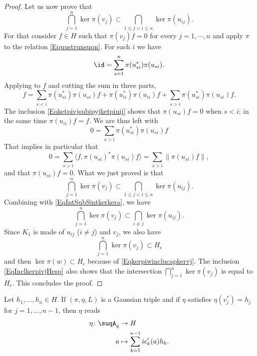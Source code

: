 \begin{proof}
    Let us now prove that
    \begin{equation}
        \bigcap_{j=1}^n\ker\pi(v_j)\subset\bigcap_{1\leq j<i\leq n}\ker\pi(u_{ij}).
    \end{equation}
    For that consider $f\in H$ such that $\pi(v_j)f=0$ for every $j=1,\cdots,n$ and apply $\pi$ to the relation \eqref{Equustrunsuqn}. For each $i$ we have
    \begin{equation}
        \id=\sum_{s=1}^n\pi(u_{si}^*)\pi(u_{si}).
    \end{equation}
    Applying to $f$ and cutting the sum in three parts,
    \begin{equation}
        f=\sum_{s<i}\pi(u_{si}^*)\pi(u_{si})f+\pi(u_{ii}^*)\pi(u_{ii})f+\sum_{s>i}\pi(u_{si}^*)\pi(u_{si})f.
    \end{equation}
    The inclusion \eqref{Eqketpivjsubipyjketpiuij} shows that $\pi(u_{si})f=0$ when $s<i$; in the same time $\pi(u_{ii})f=f$. We are thus left with
    \begin{equation}
        0=\sum_{s>i}\pi(u_{si}^*)\pi(u_{si})f
    \end{equation}
    That implies in particular that
    \begin{equation}
        0=\sum_{s>i}\langle f, \pi(u_{si})^*\pi(u_{si})f\rangle =\sum_{s>i}\| \pi(u_{si})f \|,
    \end{equation}
    and that $\pi(u_{si})f=0$. What we just proved is that
    \begin{equation}
        \bigcap_{j=1}^n\ker\pi(v_j)\subset\bigcap_{1\leq j<i\leq n}\ker\pi(u_{ij}).
    \end{equation}
    Combining with \eqref{EqIntSubSintkerkera}, we have
    \begin{equation}
        \bigcap_{j=1}^n\ker\pi(v_j)\subset\bigcap_{i\neq j}\ker\pi(u_{ij}).
    \end{equation}
    Since $K_1$ is made of $u_{ij}$ ($i\neq j$) and $v_j$, we also have
    \begin{equation}        \label{EqInclkerpivjHesp}
        \bigcap_{j=1}^n\ker\pi(v_j)\subset H_{\epsilon}
    \end{equation}
    and then $\ker \pi(w)\subset H_{\epsilon}$ because of \eqref{Eqkerpiwinclucapkervj}. The inclusion \eqref{EqInclkerpivjHesp} also shows that the intersection $\bigcap_{j=1}^n\ker\pi(v_j)$ is equal to $H_{\epsilon}$. This concludes the proof.
\end{proof}

\begin{proposition}
    Let $h_1,\ldots,h_n\in H$. If $(\pi,\eta,L)$ is a Gaussian triple and if $\eta$ satisfies $\eta(v_j^*)=h_j$ for $j=1,\ldots,n-1$, then $\eta$ reads
    \begin{equation}        \label{EqDefEtaCocyGaussU}
        \begin{aligned}
            \eta\colon \suqA_q&\to H \\
            a&\mapsto \sum_{k=1}^{n-1}i\epsilon_k'(a)h_k.
        \end{aligned}
    \end{equation}
\end{proposition}

